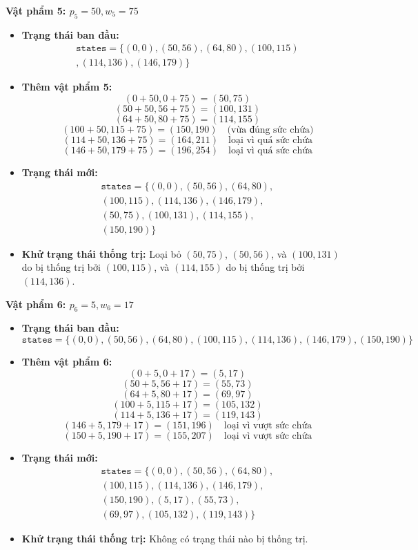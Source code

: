 \begin{example}
\textbf{Vật phẩm 5: \( p_5 = 50, w_5 = 75 \)}
\begin{itemize}
    \item \textbf{Trạng thái ban đầu:}
    \begin{align*}
        \texttt{states} =  \{(0, 0), (50, 56), (64, 80), (100, 115) \\,
                        (114, 136),(146, 179)
             \}
    \end{align*}
    \item \textbf{Thêm vật phẩm 5:}
    \[
    (0 + 50, 0 + 75) = (50, 75)
    \]
    \[
    (50 + 50, 56 + 75) = (100, 131)
    \]
    \[
    (64 + 50, 80 + 75) = (114, 155)
    \]
    \[
    (100 + 50, 115 + 75) = (150, 190) \quad \text{(vừa đúng sức chứa)}
    \]
    \[
    (114 + 50, 136 + 75) = (164, 211) \quad \text{loại vì quá sức chứa}
    \]
    \[
    (146 + 50, 179 + 75) = (196, 254) \quad \text{loại vì quá sức chứa}
    \]
    \item \textbf{Trạng thái mới:}
    \begin{align*}
        \texttt{states} = \{(0, 0), (50, 56), (64, 80), \\ (100, 115),
                        (114, 136),(146, 179), \\ (50, 75), (100, 131),
                        (114, 155), \\ (150, 190)
             \}
    \end{align*}
    \item \textbf{Khử trạng thái thống trị:} Loại bỏ \( (50, 75) \), \( (50, 56) \), và \( (100, 131) \) do bị thống trị bởi \( (100, 115) \), và \( (114, 155) \) do bị thống trị bởi \( (114, 136) \).
\end{itemize}

\textbf{Vật phẩm 6: \( p_6 = 5, w_6 = 17 \)}
\begin{itemize}
    \item \textbf{Trạng thái ban đầu:}
    \[
    \texttt{states} = \{(0, 0), (50, 56), (64, 80), (100, 115),
                        (114, 136),(146, 179),(150, 190)
             \}
    \]
    \item \textbf{Thêm vật phẩm 6:}
    \[
    (0 + 5, 0 + 17) = (5, 17)
    \]
    \[
    (50 + 5, 56 + 17) = (55, 73)
    \]
    \[
    (64 + 5, 80 + 17) = (69, 97)
    \]
    \[
    (100 + 5, 115 + 17) = (105, 132)
    \]
    \[
    (114 + 5, 136 + 17) = (119, 143)
    \]
    \[
    (146 + 5, 179 + 17) = (151, 196) \quad \text{loại vì vượt sức chứa}
    \]
    \[
    (150 + 5, 190 + 17) = (155, 207) \quad \text{loại vì vượt sức chứa}
    \]
    \item \textbf{Trạng thái mới:}
    \begin{align*}
        \texttt{states} = \{
        (0, 0), (50, 56), (64, 80), \\
        (100, 115), (114, 136),(146, 179),\\
        (150, 190), (5,17), (55, 73),\\
        (69, 97), (105, 132), (119, 143)
    \}
    \end{align*}
    \item \textbf{Khử trạng thái thống trị:} Không có trạng thái nào bị thống trị.
\end{itemize}


\end{example}

